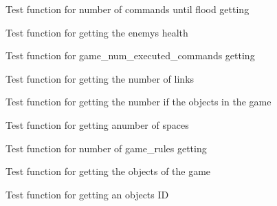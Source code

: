 \begin{DoxyRefList}
\item[Global \mbox{\hyperlink{game__test_8c_a6a9ded15668dec74fcb42e2f49371c00}{test1\+\_\+game\+\_\+get\+\_\+num\+\_\+commands\+\_\+till\+\_\+flood}} ()]\label{test__test000396}%
%
Test function for number of commands until flood getting  
\item[Global \mbox{\hyperlink{game__test_8c_a64a7096339664b32ead7c94914399851}{test1\+\_\+game\+\_\+get\+\_\+num\+\_\+enemies}} ()]\label{test__test000182}%
%
Test function for getting the enemy\textquotesingle{}s health  
\item[Global \mbox{\hyperlink{game__test_8c_a30978181541d352cc6194a4d9e3c3922}{test1\+\_\+game\+\_\+get\+\_\+num\+\_\+executed\+\_\+commands}} ()]\label{test__test000274}%
%
Test function for game\+\_\+num\+\_\+executed\+\_\+commands getting  
\item[Global \mbox{\hyperlink{game__test_8c_a857e34e335b7184cde7851e48c3ac4be}{test1\+\_\+game\+\_\+get\+\_\+num\+\_\+links}} ()]\label{test__test000264}%
%
Test function for getting the number of links  
\item[Global \mbox{\hyperlink{game__test_8c_ab2801737e2e17fc9026aad46c88073bf}{test1\+\_\+game\+\_\+get\+\_\+num\+\_\+objects}} ()]\label{test__test000195}%
%
Test function for getting the number if the objects in the game  
\item[Global \mbox{\hyperlink{game__test_8c_a11ec99eb638de0ee858ca501e7316063}{test1\+\_\+game\+\_\+get\+\_\+num\+\_\+of\+\_\+spaces}} ()]\label{test__test000221}%
%
Test function for getting anumber of spaces  
\item[Global \mbox{\hyperlink{game__test_8c_a7f834a191d9668f2f3158e4e64a26010}{test1\+\_\+game\+\_\+get\+\_\+num\+\_\+rules}} ()]\label{test__test000406}%
%
Test function for number of game\+\_\+rules getting  
\item[Global \mbox{\hyperlink{game__test_8c_a8f95a6268c69b77fee78367936c6c7eb}{test1\+\_\+game\+\_\+get\+\_\+object}} ()]\label{test__test000184}%
%
Test function for getting the objects of the game  
\item[Global \mbox{\hyperlink{game__test_8c_aabe1ea2472a473798021155a57d485ec}{test1\+\_\+game\+\_\+get\+\_\+object\+\_\+id\+\_\+at}} ()]\label{test__test000193}%
%
Test function for getting an object\textquotesingle{}s ID  

\end{DoxyRefList}

